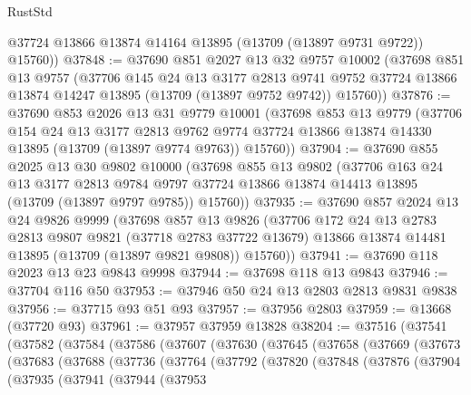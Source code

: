 \begin{lexlean}{RustStd}
\begin{coremodule}
        @37724
        @13866
        @13874
        @14164
        @13895
        (@13709 (@13897 @9731 @9722))
        @15760))
@37848 := @37690
    @851
    @2027
    @13
    @32
    @9757
    @10002
    (@37698
      @851
      @13
      @9757
      (@37706
        @145
        @24
        @13
        @3177
        @2813
        @9741
        @9752
        @37724
        @13866
        @13874
        @14247
        @13895
        (@13709 (@13897 @9752 @9742))
        @15760))
@37876 := @37690
    @853
    @2026
    @13
    @31
    @9779
    @10001
    (@37698
      @853
      @13
      @9779
      (@37706
        @154
        @24
        @13
        @3177
        @2813
        @9762
        @9774
        @37724
        @13866
        @13874
        @14330
        @13895
        (@13709 (@13897 @9774 @9763))
        @15760))
@37904 := @37690
    @855
    @2025
    @13
    @30
    @9802
    @10000
    (@37698
      @855
      @13
      @9802
      (@37706
        @163
        @24
        @13
        @3177
        @2813
        @9784
        @9797
        @37724
        @13866
        @13874
        @14413
        @13895
        (@13709 (@13897 @9797 @9785))
        @15760))
@37935 := @37690
    @857
    @2024
    @13
    @24
    @9826
    @9999
    (@37698
      @857
      @13
      @9826
      (@37706
        @172
        @24
        @13
        @2783
        @2813
        @9807
        @9821
        (@37718 @2783 @37722 @13679)
        @13866
        @13874
        @14481
        @13895
        (@13709 (@13897 @9821 @9808))
        @15760))
@37941 := @37690 @118 @2023 @13 @23 @9843 @9998
@37944 := @37698 @118 @13 @9843
@37946 := @37704 @116 @50
@37953 := @37946 @50 @24 @13 @2803 @2813 @9831 @9838
@37956 := @37715 @93 @51 @93
@37957 := @37956 @2803
@37959 := @13668 (@37720 @93)
@37961 := @37957 @37959 @13828
@38204 := @37516
    (@37541
      (@37582
        (@37584
          (@37586
            (@37607
              (@37630
                (@37645
                  (@37658
                    (@37669
                      (@37673
                        (@37683
                          (@37688
                            (@37736
                              (@37764
                                (@37792
                                  (@37820
                                    (@37848
                                      (@37876
                                        (@37904
                                          (@37935
                                            (@37941
                                              (@37944
                                                (@37953

\end{coremodule}
\end{lexlean}

